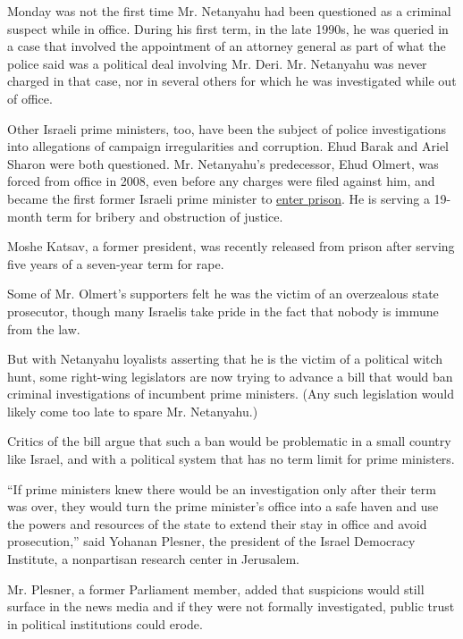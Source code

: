 Monday was not the first time Mr. Netanyahu had been questioned as a
criminal suspect while in office. During his first term, in the late
1990s, he was queried in a case that involved the appointment of an
attorney general as part of what the police said was a political deal
involving Mr. Deri. Mr. Netanyahu was never charged in that case, nor in
several others for which he was investigated while out of office.

Other Israeli prime ministers, too, have been the subject of police
investigations into allegations of campaign irregularities and
corruption. Ehud Barak and Ariel Sharon were both questioned. Mr.
Netanyahu's predecessor, Ehud Olmert, was forced from office in 2008,
even before any charges were filed against him, and became the first
former Israeli prime minister to
\href{http://www.nytimes3xbfgragh.onion/2016/02/16/world/middleeast/ehud-olmert-israel-prison.html}{enter
prison}. He is serving a 19-month term for bribery and obstruction of
justice.

Moshe Katsav, a former president, was recently released from prison
after serving five years of a seven-year term for rape.

Some of Mr. Olmert's supporters felt he was the victim of an overzealous
state prosecutor, though many Israelis take pride in the fact that
nobody is immune from the law.

But with Netanyahu loyalists asserting that he is the victim of a
political witch hunt, some right-wing legislators are now trying to
advance a bill that would ban criminal investigations of incumbent prime
ministers. (Any such legislation would likely come too late to spare Mr.
Netanyahu.)

Critics of the bill argue that such a ban would be problematic in a
small country like Israel, and with a political system that has no term
limit for prime ministers.

``If prime ministers knew there would be an investigation only after
their term was over, they would turn the prime minister's office into a
safe haven and use the powers and resources of the state to extend their
stay in office and avoid prosecution,'' said Yohanan Plesner, the
president of the Israel Democracy Institute, a nonpartisan research
center in Jerusalem.

Mr. Plesner, a former Parliament member, added that suspicions would
still surface in the news media and if they were not formally
investigated, public trust in political institutions could erode.

